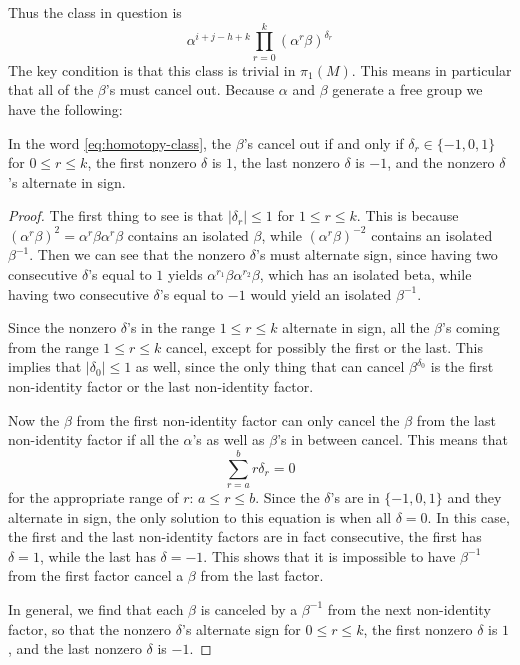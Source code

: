 \documentclass[12pt]{amsart}
\begin{document}
Thus the class in question is
\begin{equation}
  \label{eq:homotopy-class}
  \alpha^{i+j-h+k} \prod_{r = 0}^k (\alpha^r \beta)^{\delta_r}
\end{equation}
 The key condition is that this class is trivial in
$\pi_1(M)$. This means in particular that all of the $\beta$'s must
cancel out. Because $\alpha$ and $\beta$ generate a free group we have
the following:

\begin{lemma}
\label{lem:beta-cancel}
  In the word \eqref{eq:homotopy-class}, the $\beta$'s cancel out if
  and only if $\delta_r \in \{-1,0,1\}$ for $0 \leq r \leq k$, the
  first nonzero $\delta$ is $1$, the last nonzero $\delta$ is $-1$, and
  the nonzero $\delta$'s alternate in sign.
\end{lemma}

\begin{proof}
  The first thing to see is that $|\delta_r| \leq 1$ for $1 \leq r
  \leq k$. This is because $(\alpha^r\beta)^2 =
  \alpha^r\beta\alpha^r\beta$ contains an isolated $\beta$, while
  $(\alpha^r \beta)^{-2}$ contains an isolated $\beta^{-1}$. Then we
  can see that the nonzero $\delta$'s must alternate sign, since
  having two consecutive $\delta$'s equal to $1$ yields
  $\alpha^{r_1}\beta\alpha^{r_2}\beta$, which has an isolated beta,
  while having two consecutive $\delta$'s equal to $-1$ would yield an
  isolated $\beta^{-1}$.

  Since the nonzero $\delta$'s in the range $1 \leq r \leq k$
  alternate in sign, all the $\beta$'s coming from the
  range $1 \leq r \leq k$ cancel, except for possibly the first or the
  last. This implies that $|\delta_0| \leq 1$ as well, since the only
  thing that can cancel $\beta^{\delta_0}$ is the first non-identity factor or
  the last non-identity factor. 

  Now the $\beta$ from the first non-identity factor can only cancel
  the $\beta$ from the last non-identity factor if all the $\alpha$'s
  as well as $\beta$'s in between cancel. This means that
    \begin{equation}
    \sum_{r = a}^b r\delta_r = 0
  \end{equation}
  for the appropriate range of $r$: $a \leq r \leq b$. Since the
  $\delta$'s are in $\{-1,0,1\}$ and they alternate in sign, the only
  solution to this equation is when all $\delta = 0$. In this case,
  the first and the last non-identity factors are in fact
  consecutive, the first has $\delta = 1$, while the last has $\delta
  = -1$. This shows that it is impossible to have $\beta^{-1}$ from
  the first factor cancel a $\beta$ from the last factor.

  In general, we find that each $\beta$ is canceled by a $\beta^{-1}$
  from the next non-identity factor, so that the nonzero $\delta$'s
  alternate sign for $0 \leq r \leq k$, the first nonzero $\delta$ is
  $1$, and the last nonzero $\delta$ is $-1$.
\end{proof}
\end{document}
